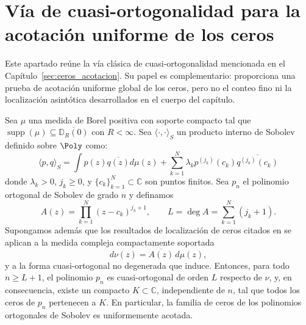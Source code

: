 \section{Vía de cuasi-ortogonalidad para la acotación uniforme de los ceros}\label{ap:cuasi_ortogonalidad_ceros}

Este apartado reúne la vía clásica de cuasi-ortogonalidad mencionada en el Capítulo~\ref{sec:ceros_acotacion}. Su papel es complementario: proporciona una prueba de acotación uniforme global de los ceros, pero no el conteo fino ni la localización asintótica desarrollados en el cuerpo del capítulo.

\begin{thm}\label{thm:acotacion_ceros}
	Sea $\mu$ una medida de Borel positiva con soporte compacto tal que $\operatorname{supp}(\mu) \subseteq \overline{\mathbb{D}_R(0)}$ con $R < \infty$. Sea $\langle \cdot, \cdot \rangle_S$ un producto interno de Sobolev definido sobre $\Poly$ como:
	\begin{equation}\label{eq:sobolev_general}
		\langle p, q \rangle_S = \int p(z)\overline{q(z)} d\mu(z) + \sum_{k=1}^N \lambda_k p^{(j_k)}(c_k) \overline{q^{(j_k)}(c_k)}
	\end{equation}
	donde $\lambda_k > 0$, $j_k \ge 0$, y $\{c_k\}_{k=1}^N \subset \mathbb{C}$ son puntos finitos. Sea $p_n$ el polinomio ortogonal de Sobolev de grado $n$ y definamos
	\[
		A(z)=\prod_{k=1}^N (z-c_k)^{j_k+1},
		\qquad
		L = \deg A = \sum_{k=1}^N (j_k+1).
	\]
	Supongamos además que los resultados de localización de ceros citados en
	\cite{lopez1999zero,lopez2001sobolev,marcellan2015sobolev} se aplican a la
	medida compleja compactamente soportada
	\[
		d\nu(z)=\overline{A(z)}\,d\mu(z),
	\]
	y a la forma cuasi-ortogonal no degenerada que induce. Entonces, para todo $n \ge L+1$, el polinomio $p_n$ es cuasi-ortogonal de orden $L$ respecto de $\nu$,
	y, en consecuencia, existe un compacto $K \subset \mathbb{C}$, independiente de $n$, tal que todos los ceros de $p_n$ pertenecen a $K$. En particular, la familia de ceros de los polinomios ortogonales de Sobolev es uniformemente acotada.
\end{thm}

